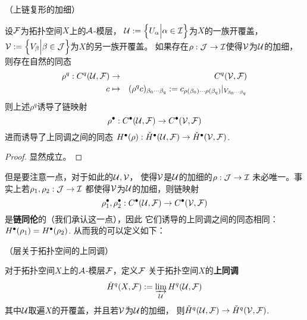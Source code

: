 \begin{prop}（\Cech 上链复形的加细）

设$\mathcal{F}$为拓扑空间$X$上的$\mathcal{A}$-模层，
$\mathcal{U}:=\Big\{ U_\alpha \Big| \alpha\in\mathcal{I} \Big\}$为$X$的一族开覆盖，
$\mathcal{V}:=\Big\{ V_\beta \Big| \beta\in\mathcal{J} \Big\}$为$X$的另一族开覆盖。
如果存在$\rho:\mathcal{J}\to\mathcal{I}$使得$\mathcal{V}$为$\mathcal{U}$的加细，
则存在自然的同态
\begin{eqnarray*}
  \rho^q:C^q(\mathcal{U},\mathcal{F})&\to&
  C^q(\mathcal{V},\mathcal{F})
\\
  c&\mapsto&
  (\rho^qc)_{\beta_0\cdots\beta_q}
  :=c_{\rho(\beta_0)\cdots\rho(\beta_q)}|_{V_{\beta_0\cdots\beta_q}}
\end{eqnarray*}
则上述$\rho^q$诱导了链映射
$$
  \rho^{\bullet}:C^{\bullet}(\mathcal{U},\mathcal{F})
\to C^{\bullet}(\mathcal{V},\mathcal{F})
$$
进而诱导了\Cech 上同调之间的同态
$H^{\bullet}(\rho):\check{H}^{\bullet}(\mathcal{U},\mathcal{F})\to\check{H}^{\bullet}(\mathcal{V},\mathcal{F})$.
\end{prop}

\begin{proof}
  显然成立。
\end{proof}

但是要注意一点，对于如此的$\mathcal{U},\mathcal{V}$，
使得$\mathcal{V}$是$\mathcal{U}$的加细的$\rho:\mathcal{J}\to\mathcal{I}$
未必唯一。事实上若$\rho_1,\rho_2:\mathcal{J}\to\mathcal{I}$
都使得$\mathcal{V}$为$\mathcal{U}$的加细，则链映射
$$
  \rho_1^{\bullet},\rho_2^{\bullet}:
  C^{\bullet}(\mathcal{U},\mathcal{F})
  \to
  C^{\bullet}(\mathcal{V},\mathcal{F})
$$
是\textbf{链同伦}的（我们承认这一点），因此
它们诱导的\Cech 上同调之间的同态相同：$H^{\bullet}(\rho_1)=H^{\bullet}(\rho_2)$.
从而我的可以定义如下：


\begin{definition}（层关于拓扑空间的\Cech 上同调）

对于拓扑空间$X$上的$\mathcal{A}$-模层$\mathcal{F}$，定义$\mathcal{F}$
关于拓扑空间$X$的\textbf{\Cech 上同调}
$$\check{H}^q(X,\mathcal{F}):=\varinjlim_{\mathcal{U}} H^q(\mathcal{U},\mathcal{F})$$
其中$\mathcal{U}$取遍$X$的开覆盖，并且若$\mathcal{V}$为$\mathcal{U}$的加细，
则$\check{H}^q(\mathcal{U},\mathcal{F})\to\check{H}^q(\mathcal{V},\mathcal{F})$.
\end{definition}

